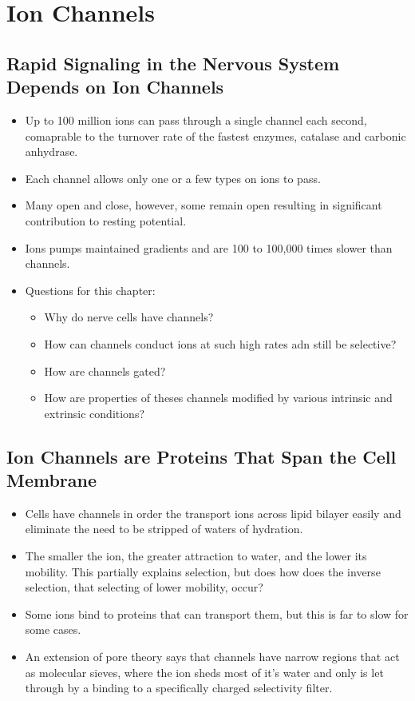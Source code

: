 \documentclass[12pt,a4paper]{article}
\begin{document}
\clearpage
\section{Ion Channels}
\subsection{Rapid Signaling in the Nervous System Depends on Ion Channels}
\begin{itemize}
    \item Up to 100 million ions can pass through a single channel each second, comaprable to the turnover rate of the fastest enzymes, catalase and carbonic anhydrase.
    \item Each channel allows only one or a few types on ions to pass.
    \item Many open and close, however, some remain open resulting in significant contribution to resting potential. 
    \item Ions pumps maintained gradients and are 100 to 100,000 times slower than channels.
    \item Questions for this chapter:
        \begin{itemize}
            \item Why do nerve cells have channels?
            \item How can channels conduct ions at such high rates adn still be selective?
            \item How are channels gated?
            \item How are properties of theses channels modified by various intrinsic and extrinsic conditions?
        \end{itemize}
\end{itemize}

\subsection{Ion Channels are Proteins That Span the Cell Membrane}
\begin{itemize}
    \item Cells have channels in order the transport ions across lipid bilayer easily and eliminate the need to be stripped of waters of hydration.
    \item The smaller the ion, the greater attraction to water, and the lower its mobility. This partially explains selection, but does how does the inverse selection, that selecting of lower mobility, occur?
    \item Some ions bind to proteins that can transport them, but this is far to slow for some cases.
    \item An extension of pore theory says that channels have narrow regions that act as molecular sieves, where the ion sheds most of it's water and only is let through by a binding to a specifically charged selectivity filter. 
\end{itemize}
\end{document}
